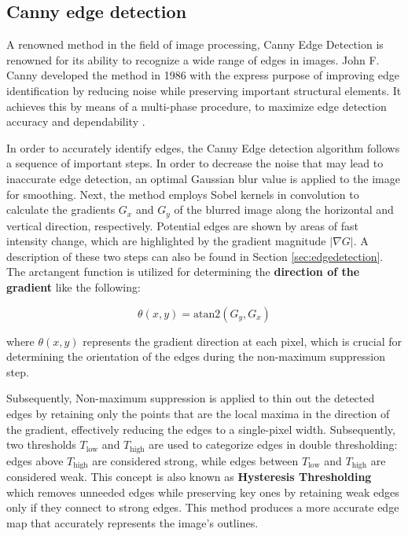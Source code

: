 \documentclass[%
	a4paper, %
	12pt, %
	english, %
	bibtotoc %
]{scrartcl}
\begin{document}
\subsection{Canny edge detection}

A renowned method in the field of image processing, Canny Edge Detection is renowned for its ability to recognize a wide range of edges in images. John F. Canny developed the method in 1986 with the express purpose of improving edge identification by reducing noise while preserving important structural elements. It achieves this by means of a multi-phase procedure, to maximize edge detection accuracy and dependability \cite{canny_computational_approach}.


In order to accurately identify edges, the Canny Edge detection algorithm follows a sequence of important steps. In order to decrease the noise that may lead to inaccurate edge detection, an optimal Gaussian blur value is applied to the image for smoothing. Next, the method employs Sobel kernels in convolution to calculate the gradients \( G_x \) and \( G_y \) of the blurred image along the horizontal and vertical direction, respectively. Potential edges are shown by areas of fast intensity change, which are highlighted by the gradient magnitude \( |\nabla G| \). A description of these two steps can also be found in Section \ref{sec:edgedetection}. The arctangent function is utilized for determining the \textbf{direction of the gradient} like the following:

\begin{equation}
\theta(x, y) = \text{atan2}\left(G_y, G_x\right)
\end{equation}

where \(\theta(x, y)\) represents the gradient direction at each pixel, which is crucial for determining the orientation of the edges during the non-maximum suppression step.

Subsequently, Non-maximum suppression is applied to thin out the detected edges by retaining only the points that are the local maxima in the direction of the gradient, effectively reducing the edges to a single-pixel width. Subsequently, two thresholds \( T_{\text{low}} \) and \( T_{\text{high}} \) are used to categorize edges in double thresholding: edges above \( T_{\text{high}} \) are considered strong, while edges between \( T_{\text{low}} \) and \( T_{\text{high}} \) are considered weak. This concept is also known as   \textbf{Hysteresis Thresholding} which removes unneeded edges while preserving key ones by retaining weak edges only if they connect to strong edges. This method produces a more accurate edge map that accurately represents the image's outlines.
\end{document}
